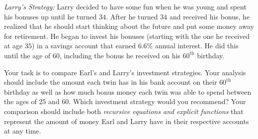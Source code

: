 \documentclass[10pt,]{book}
\theoremstyle{plain}
\theoremstyle{definition}
\theoremstyle{definition}
\theoremstyle{definition}
\numberwithin{equation}{section}
\begin{document}
\begin{exerciselist}
\hypertarget{p-192}{}%
%
\par
\hypertarget{p-193}{}%
\emph{Larry's Strategy:} Larry decided to have some fun when he was young and spent his bonuses up until he turned \(34\).  After he turned \(34\) and received his bonus, he realized that he should start thinking about the future and put some money away for retirement.  He began to invest his bonuses (starting with the one he received at age \(35\)) in a savings account that earned \(6.6\%\) annual interest.  He did this until the age of \(60\), including the bonus he received on his \(60^{\text{th}}\) birthday.%
\par
\hypertarget{p-194}{}%
%
\par
\hypertarget{p-195}{}%
Your task is to compare Earl's and Larry's investment strategies.  Your analysis should include the amount each twin has in his bank account on their \(60^{\text{th}}\) birthday as well as how much bonus money each twin was able to spend between the ages of \(25\) and \(60\).  Which investment strategy would you recommend?  Your comparison should include both \emph{recursive equations and explicit functions} that represent the amount of money Earl and Larry have in their respective accounts at any time.%
\par\smallskip
\end{exerciselist}
\typeout{************************************************}
\typeout{************************************************}
\end{document}
